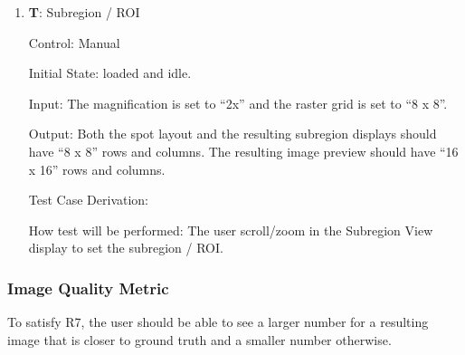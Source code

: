 \documentclass[12pt, titlepage]{article}
\newcounter{testnum} %
\begin{document}
\begin{enumerate}
    \item{\textbf{T\thetestnum \label{T_subregion}}: Subregion / ROI\\}

    Control: Manual
                
    Initial State: \progname{} loaded and idle.
              
    Input: The magnification is set to ``2x'' and the raster grid is set to ``8 x 8''.
              
    Output: Both the spot layout and the resulting subregion displays should have ``8 x 8'' rows and columns. The resulting image preview should have ``16 x 16'' rows and columns.

    Test Case Derivation: 

    How test will be performed: The user scroll/zoom in the Subregion View display to set the subregion / ROI.

\end{enumerate}


\subsubsection{Image Quality Metric} \label{subsec_img_metric}

To satisfy R7, the user should be able to see a larger number for a resulting image that is closer to ground truth 
and a smaller number otherwise.
\end{document}
